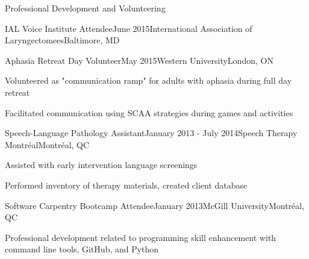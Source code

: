 \documentclass{resume} %
\begin{document}
\begin{rSection}{Professional Development and Volunteering}
\begin{rSubsection}{IAL Voice Institute Attendee}{June 2015}{International Association of Laryngectomees}{Baltimore, MD}
	\end{rSubsection}
	

	
	\begin{rSubsection}{Aphasia Retreat Day Volunteer}{May 2015}{Western University}{London, ON}
	\item Volunteered as "communication ramp" for adults with aphasia during full day retreat
	\item Facilitated communication using SCAA strategies during games and activities 
	
	\end{rSubsection}
	
	
	
	\begin{rSubsection}{Speech-Language Pathology Assistant}{January 2013 - July 2014}{Speech Therapy Montr\'eal}{Montr\'eal, QC}
	\item Assisted with early intervention language screenings
	\item Performed inventory of therapy materials, created client database
	\end{rSubsection}
	
	
	\begin{rSubsection}{Software Carpentry Bootcamp Attendee}{January 2013}{McGill University}{Montr\'eal, QC}
	\item Professional development related to programming skill enhancement with command line tools, GitHub, and Python
	\end{rSubsection}
	
	
	
	
	

\end{rSection}
\end{document}
